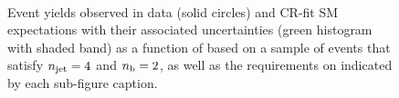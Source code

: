 \begin{figure}[h!]
\begin{center}
    \\
    \caption{Event yields observed in data (solid circles) and CR-fit SM expectations with their associated uncertainties (green histogram with shaded band) as a function of \HTmiss based on a sample of events that satisfy $n_{\text{jet}} = 4$ and $n_{\text{b}} = 2$, as well as the requirements on \scalht indicated by each sub-figure caption. }
    \label{fig:mhtdim_eq4j_eq2b}
  \end{center}
\end{figure}

